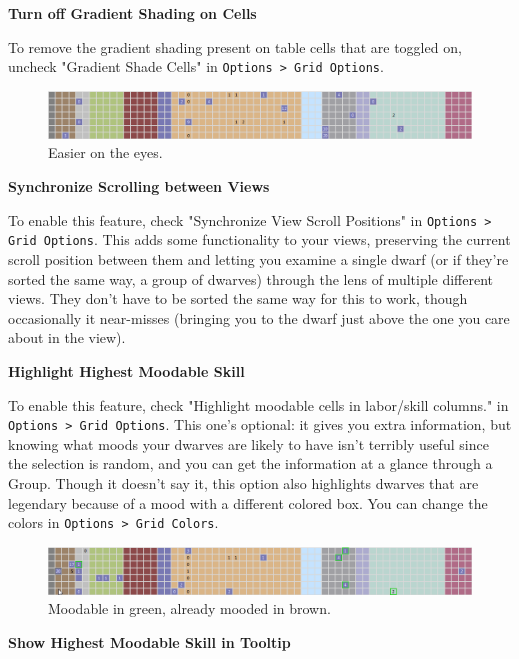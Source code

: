 \documentclass[]{article}
\begin{document}
\noindent \textbf{Turn off Gradient Shading on Cells}

To remove the gradient shading present on table cells that are toggled on, uncheck "Gradient Shade Cells"
in \texttt{Options > Grid Options}.
\begin{figure}[h!] \centering
\includegraphics[width=\linewidth]{Sec2Fig21}
\caption{Easier on the eyes.}
\end{figure}

\noindent \textbf{Synchronize Scrolling between Views}

To enable this feature, check "Synchronize View Scroll Positions" in \texttt{Options > Grid Options}.
This adds some functionality to your views, preserving the current scroll position between them and
letting you examine a single dwarf (or if they're sorted the same way, a group of dwarves) through the
lens of multiple different views. They don't have to be sorted the same way for this to work, though
occasionally it near-misses (bringing you to the dwarf just above the one you care about in the view).
\vspace{12pt}

\noindent \textbf{Highlight Highest Moodable Skill}

To enable this feature, check "Highlight moodable cells in labor/skill columns." in \texttt{Options >
Grid Options}. This one's optional: it gives you extra information, but knowing what moods your dwarves
are likely to have isn't terribly useful since the selection is random, and you can get the information
at a glance through a Group. Though it doesn't say it, this option also highlights dwarves that are
legendary because of a mood with a different colored box. You can change the colors in \texttt{Options >
Grid Colors}.

\begin{figure}[h!] \centering
\includegraphics[width=\linewidth]{Sec2Fig22}
\caption{Moodable in green, already mooded in brown.}
\end{figure}

\noindent \textbf{Show Highest Moodable Skill in Tooltip}
\end{document}
